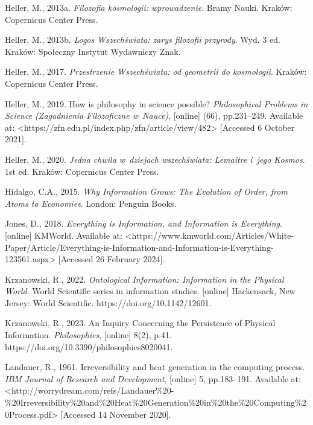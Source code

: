 Heller, M., 2013a. \textit{Filozofia kosmologii: wprowadzenie}. Bramy Nauki. Kraków: Copernicus Center Press.



Heller, M., 2013b. \textit{Logos Wszechświata: zarys filozofii przyrody}. Wyd. 3 ed. Kraków: Społeczny Instytut Wydawniczy Znak.



Heller, M., 2017. \textit{Przestrzenie Wszechświata: od geometrii do kosmologii}. Kraków: Copernicus Center Press.



Heller, M., 2019. How is philosophy in science possible? \textit{Philosophical Problems in Science (Zagadnienia Filozoficzne w~Nauce)}, [online] (66), pp.231–249. Available at: {\textless}https://zfn.edu.pl/index.php/zfn/article/view/482{\textgreater} [Accessed 6 October 2021].



Heller, M., 2020. \textit{Jedna chwila w~dziejach wszechświata: Lemaître i~jego Kosmos}. 1st ed. Kraków: Copernicus Center Press.



Hidalgo, C.A., 2015. \textit{Why Information Grows: The Evolution of Order, from Atoms to Economies}. London: Penguin Books.



Jones, D., 2018. \textit{Everything is Information, and Information is Everything}. [online] KMWorld. Available at: {\textless}https://www.kmworld.com/Articles/White-Paper/Article/Everything-is-Information-and-Information-is-Everything-123561.aspx{\textgreater} [Accessed 26 February 2024].



Krzanowski, R., 2022. \textit{Ontological Information: Information in the Physical World}. World Scientific series in information studies. [online] Hackensack, New Jersey: World Scientific. https://doi.org/10.1142/12601.



Krzanowski, R., 2023. An Inquiry Concerning the Persistence of Physical Information. \textit{Philosophies}, [online] 8(2), p.41. https://doi.org/10.3390/philosophies8020041.



Landauer, R., 1961. Irreversibility and heat generation in the computing process. \textit{IBM Journal of Research and Development}, [online] 5, pp.183–191. Available at: {\textless}http://worrydream.com/refs/Landauer\%20-\%20Irreversibility\%20and\%20Heat\%20Generation\%20in\%20the\%20Computing\%20Process.pdf{\textgreater} [Accessed 14 November 2020].



